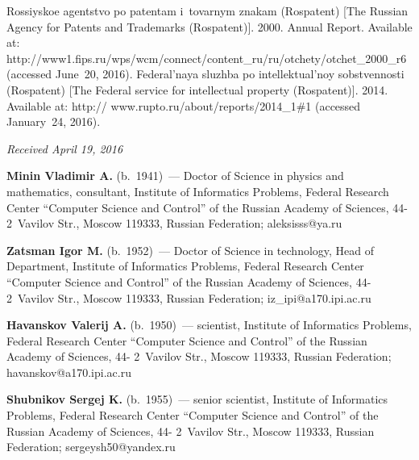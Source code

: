 \begin{multicols}{2}
{{\begin{thebibliography}{99}
\pagebreak

Rossiyskoe agentstvo po patentam i~tovarnym znakam (Rospatent) 
[The Russian Agency for Patents and Trademarks (Rospatent)]. 2000.
 Annual Report. Available at: {\sf 
http://www1.fips.ru/wps/wcm/connect/content\_ru/\linebreak ru/otchety/otchet\_2000\_r6} 
(accessed June~20, 2016).
Federal'naya sluzhba po intellektual'noy sobstvennosti (Rospatent) [The Federal 
service for intellectual property (Rospatent)]. 2014. Available at: {\sf 
http:// www.rupto.ru/about/reports/2014\_1\#1} (accessed January~24, 2016).
  \end{thebibliography}

 }
 }

\end{multicols}

\vspace*{-3pt}

\hfill{\small\textit{Received April 19, 2016}}

\Contr

\noindent
\textbf{Minin Vladimir A.} (b.\ 1941)~--- Doctor of Science in physics and mathematics, consultant, 
Institute of Informatics Problems, Federal Research Center ``Computer Science and Control'' of the 
Russian Academy of Sciences, 44-2~Vavilov Str., Moscow 119333, Russian Federation; 
\mbox{aleksisss@ya.ru}

      \vspace*{3pt}
      
      \noindent
      \textbf{Zatsman Igor M.} (b.\ 1952)~--- Doctor of Science in technology, Head of 
Department, Institute of Informatics Problems, Federal Research Center ``Computer Science and 
Control'' of the Russian Academy of Sciences, 44-2~Vavilov Str., Moscow 119333, Russian 
Federation; \mbox{iz\_ipi@a170.ipi.ac.ru} 

      \vspace*{3pt}
      
      \noindent
      \textbf{Havanskov Valerij A.} (b.\ 1950)~--- scientist, Institute of Informatics Problems, 
Federal Research Center ``Computer Science and Control'' of the Russian Academy of Sciences, 44-
2~Vavilov Str., Moscow 119333, Russian Federation; \mbox{havanskov@a170.ipi.ac.ru} 
     
      \vspace*{3pt}
      
      \noindent
      \textbf{Shubnikov Sergej K.} (b.\ 1955)~--- senior scientist, Institute of Informatics Problems, 
Federal Research Center ``Computer Science and Control'' of the Russian Academy of Sciences, 44-
2~Vavilov Str., Moscow 119333, Russian Federation; \mbox{sergeysh50@yandex.ru} 
      
\label{end\stat}


\renewcommand{\bibname}{\protect\rm Литература}     